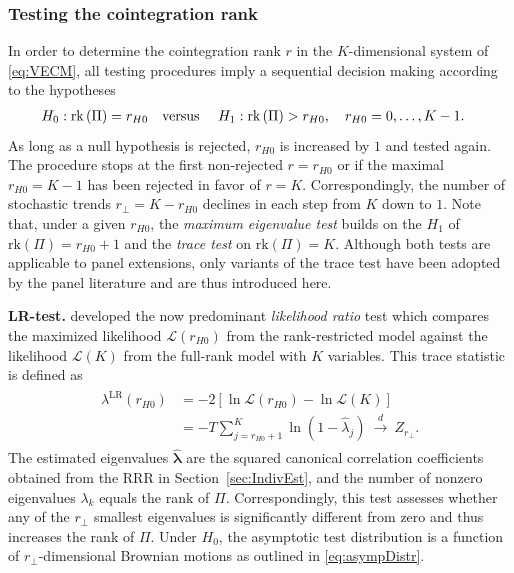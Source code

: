 \subsubsection{Testing the cointegration rank} \label{sec:IndivTest}
In order to determine the cointegration rank $ r $ in the $ K $-dimensional system of \eqref{eq:VECM}, all testing procedures imply a sequential decision making according to the hypotheses 
\begin{align} \label{eq:RankHypo}
\begin{split}
	H_0: \text{rk}\left( \Pi \right) = r_{H0} & \text{\quad versus \quad} H_1: \text{rk} \left( \Pi \right) > r_{H0}, \quad r_{H0}=0, \ldots, K-1.
\end{split}
\end{align}
As long as a null hypothesis is rejected, $r_{H0}$ is increased by $1$ and tested again. The procedure stops at the first non-rejected $ r = r_{H0} $ or if the maximal $r_{H0} = K - 1$ has been rejected in favor of $ r = K $. Correspondingly, the number of stochastic trends $ r_\perp = K - r_{H0} $ declines in each step from $K$ down to $1$. Note that, under a given $r_{H0}$, the \textit{maximum eigenvalue test} builds on the $ H_ 1 $ of $ \text{rk}(\Pi) = r_{H0} + 1 $ and the \textit{trace test} on $ \text{rk}(\Pi) = K $. Although both tests are applicable to panel extensions, only variants of the trace test have been adopted by the panel literature and are thus introduced here.


\textbf{LR-test.} \citet{Johansen1988} developed the now predominant \textit{likelihood ratio} test which compares the maximized likelihood $ \mathcal{L}(r_{H0}) $ from the rank-restricted model against the likelihood $ \mathcal{L}(K) $ from the full-rank model with $ K $ variables. This trace statistic is defined as
\begin{align} \label{eq:LRrank}
\begin{split}
	\lambda^{\text{LR}} \left( r_{H0} \right) & = -2 \left[ \ln \mathcal{L}(r_{H0}) - \ln \mathcal{L}(K) \right] \\
	& = -T \sum_{j=r_{H0}+1}^{K} \ln(1-\hat{\lambda}_j) \ \overset{d}{\longrightarrow} \ Z_{r_\perp}. 
\end{split}
\end{align}
The estimated eigenvalues $ \boldsymbol{\hat{\lambda}} $ are the squared canonical correlation coefficients obtained from the RRR in Section~\ref{sec:IndivEst}, and the number of nonzero eigenvalues $ \lambda_k $ equals the rank of $ \Pi $. Correspondingly, this test assesses whether any of the $ r_\perp $ smallest eigenvalues is significantly different from zero and thus increases the rank of $ \Pi $. Under $ H_0 $, the asymptotic test distribution is a function of $ r_\perp $-dimensional Brownian motions as outlined in \eqref{eq:asympDistr}.



